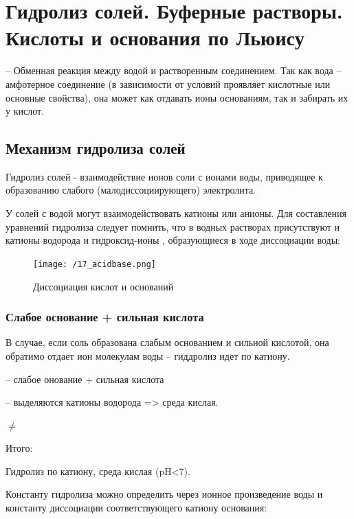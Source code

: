 \section{Гидролиз солей. Буферные растворы. Кислоты и основания по Льюису}

 -- Обменная реакция между водой и растворенным соединением. Так как вода -- амфотерное соединение (в зависимости от условий проявляет кислотные или основные свойства), она может как отдавать ионы  основаниям, так и забирать их у кислот.

\subsection{Механизм гидролиза солей}

Гидролиз солей - взаимодействие ионов соли с ионами воды, приводящее к образованию слабого (малодиссоциирующего) электролита.

У солей с водой могут взаимодействовать катионы или анионы. Для составления уравнений гидролиза следует помнить, что в водных растворах присутствуют и катионы водорода  и гидроксид-ионы , образующиеся в ходе диссоциации воды:


\begin{figure}[H]
    \centering
    \texttt{[image: /17\_acidbase.png]}
    \caption{Диссоциация кислот и оснований}
    \label{fig:acidbase}
\end{figure}

\subsubsection{Слабое основание + сильная кислота}

В случае, если соль образована слабым основанием и сильной кислотой, она обратимо отдает ион  молекулам воды -- гиддролиз идет по катиону.


 -- слабое онование + сильная кислота

 -- выделяются катионы водорода => среда кислая.

 $\neq$  

Итого:


Гидролиз по катиону, среда кислая (pH<7).

Константу гидролиза можно определить  через ионное произведение воды и константу диссоциации соответствующего катиону основания:

